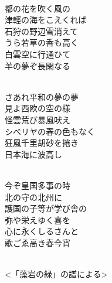\documentclass[10pt,b5j]{tarticle} %
\begin{document}
\vspace{1.5em} %
\newcommand{\linespace}{0.5em} %
\newcommand{\blocksize}{0.5\hsize} %
\newcommand{\itemmargin}{3em} %
\begin{enumerate} %
    \setlength{\itemindent}{\itemmargin} %
    \begin{minipage}[c]{\blocksize}
    
        \vspace{\linespace}
        \item~\\
        都の花を吹く風の\\
        津輕の海をこえくれば\\
        石狩の野辺雪消えて\\
        うら若草の香も高く\\
        白雲空に行通ひて\\
        羊の夢ぞ長閑なる
        
    \end{minipage}
    \begin{minipage}[c]{\blocksize}
        
        \vspace{\linespace}
        \item~\\
        さあれ平和の夢の夢\\
        見よ西欧の空の様\\
        怪雲荒び暴風吠え\\
        シベリヤの春の色もなく\\
        狂風千里胡砂を捲き\\
        日本海に波高し
        
    \end{minipage}
    \begin{minipage}[c]{\blocksize}
        
        \vspace{\linespace}
        \item~\\
        今ぞ皇国多事の時\\
        北の守の北州に\\
        護国の子等が学び舎の\\
        弥や栄えゆく喜を\\
        心に永くしるさんと\\
        歌ごゑ高き春今宵
        
    \end{minipage}
    \begin{minipage}[c]{\blocksize}
        
        \vspace{\linespace}
        \item~\\
        <「藻岩の緑」の譜による>
    
    \end{minipage}
\end{enumerate} %
\end{document}
